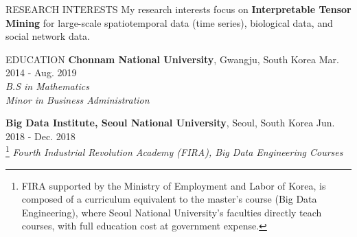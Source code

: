 \documentclass[10pt]{resume} %
\begin{document}


\begin{rSection}{RESEARCH INTERESTS}
My research interests focus on {\bf Interpretable Tensor Mining} for large-scale spatiotemporal data (time series), biological data, and social network data.
\end{rSection}
%
\begin{rSection}{EDUCATION}
{\bf Chonnam National University}, Gwangju, South Korea \hfill Mar. 2014 - Aug. 2019 \\
\textit{B.S in Mathematics} \\
\textit{Minor in Business Administration}

%
{\bf Big Data Institute, Seoul National University}, Seoul, South Korea \hfill Jun. 2018 - Dec. 2018 \\
\footnote{\small 
		FIRA supported by the Ministry of Employment and Labor of Korea, is composed of a curriculum equivalent to the master's course (Big Data Engineering), where Seoul National University's faculties directly teach courses, 
		    with full education cost at government expense.
		 }
\textit{Fourth Industrial Revolution Academy (FIRA), Big Data Engineering Courses} 
\end{rSection}
\end{document}
